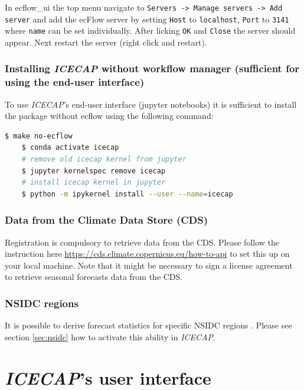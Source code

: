 \documentclass[DIV=10, parskip=full]{scrreprt}
\newcommand{\ice}{\textit{ICECAP}\xspace}
\begin{document}
	

In ecflow\_ui the top menu navigate to \texttt{Servers -> Manage servers -> Add server} and add the ecFlow server by setting \texttt{Host} to \texttt{localhost}, \texttt{Port} to \texttt{3141} where \texttt{name} can be set individually. After licking \texttt{OK} and \texttt{Close} the server should appear. Next restart the server (right click and restart).\\

\subsection{Installing \ice without workflow manager (sufficient for using the end-user interface)}
To use  \ice's end-user interface (jupyter notebooks) it is sufficient to install the package without ecflow using the following command:
\begin{lstlisting}[language=bash]
	$ make no-ecflow
	$ conda activate icecap
	# remove old icecap kernel from jupyter
	$ jupyter kernelspec remove icecap
	# install icecap kernel in jupyter
	$ python -m ipykernel install --user --name=icecap
\end{lstlisting}



	
\subsection{Data from the Climate Data Store (CDS)}
\label{subsec:cds}
Registration is compulsory to retrieve data from the CDS. Please follow the instruction here \url{https://cds.climate.copernicus.eu/how-to-api} to set this up on your local machine. Note that it might be necessary to sign a license agreement to retrieve seasonal forecasts data from the CDS.


	
\subsection{NSIDC regions}
\label{subsec:nsidc}
It is possible to derive forecast statistics for specific NSIDC regions \citep{Meier2023}. Please see section \ref{sec:nsidc} how to activate this ability in \ice.

\chapter{\ice's user interface}
\end{document}
